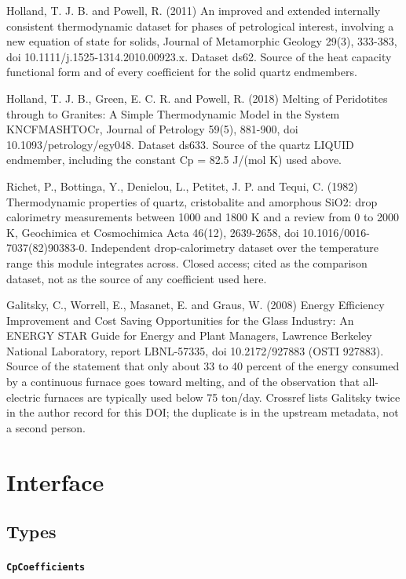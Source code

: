 \documentclass[10pt,a4paper,twoside]{report}
\begin{document}
Holland, T. J. B. and Powell, R. (2011) An improved and extended internally consistent thermodynamic dataset for phases of petrological interest, involving a new equation of state for solids, Journal of Metamorphic Geology 29(3), 333-383, doi 10.1111/j.1525-1314.2010.00923.x. Dataset ds62. Source of the heat capacity functional form and of every coefficient for the solid quartz endmembers.

Holland, T. J. B., Green, E. C. R. and Powell, R. (2018) Melting of Peridotites through to Granites: A Simple Thermodynamic Model in the System KNCFMASHTOCr, Journal of Petrology 59(5), 881-900, doi 10.1093/petrology/egy048. Dataset ds633. Source of the quartz LIQUID endmember, including the constant Cp = 82.5 J/(mol K) used above.

Richet, P., Bottinga, Y., Denielou, L., Petitet, J. P. and Tequi, C. (1982) Thermodynamic properties of quartz, cristobalite and amorphous SiO2: drop calorimetry measurements between 1000 and 1800 K and a review from 0 to 2000 K, Geochimica et Cosmochimica Acta 46(12), 2639-2658, doi 10.1016/0016-7037(82)90383-0. Independent drop-calorimetry dataset over the temperature range this module integrates across. Closed access; cited as the comparison dataset, not as the source of any coefficient used here.

Galitsky, C., Worrell, E., Masanet, E. and Graus, W. (2008) Energy Efficiency Improvement and Cost Saving Opportunities for the Glass Industry: An ENERGY STAR Guide for Energy and Plant Managers, Lawrence Berkeley National Laboratory, report LBNL-57335, doi 10.2172/927883 (OSTI 927883). Source of the statement that only about 33 to 40 percent of the energy consumed by a continuous furnace goes toward melting, and of the observation that all-electric furnaces are typically used below 75 ton/day. Crossref lists Galitsky twice in the author record for this DOI; the duplicate is in the upstream metadata, not a second person.

\section{Interface}

\subsection*{Types}

\paragraph{\texttt{CpCoefficients}}
\end{document}

